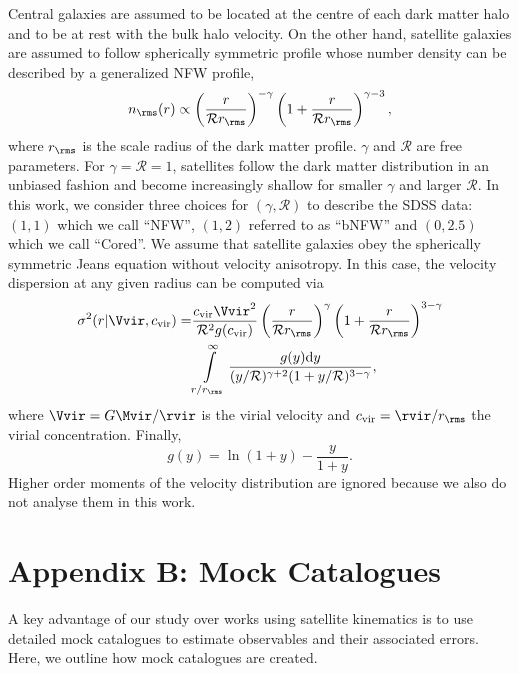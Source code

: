 \documentclass[fleqn,usenatbib,useAMS]{mnras}
\begin{document}
Central galaxies are assumed to be located at the centre of each dark matter halo and to be at rest with the bulk halo velocity. On the other hand, satellite galaxies are assumed to follow spherically symmetric profile whose number density can be described by a generalized NFW profile,
\begin{equation}
n_\rms (r) \propto \left( \frac{r}{\mathcal{R} r_\rms} \right)^{-\gamma} \left( 1 + \frac{r}{\mathcal{R} r_\rms} \right)^{\gamma - 3},
\end{equation}
where $r_\rms$ is the scale radius of the dark matter profile. $\gamma$ and $\mathcal{R}$ are free parameters. For $\gamma = \mathcal{R} = 1$, satellites follow the dark matter distribution in an unbiased fashion and become increasingly shallow for smaller $\gamma$ and larger $\mathcal{R}$. In this work, we consider three choices for $(\gamma, \mathcal{R})$ to describe the SDSS data: $(1, 1)$ which we call ``NFW'', $(1, 2)$ referred to as ``bNFW'' and $(0, 2.5)$ which we call ``Cored''.
We assume that satellite galaxies obey the spherically symmetric Jeans equation without velocity anisotropy. In this case, the velocity dispersion at any given radius can be computed via
\begin{align}
\sigma^2 (r | \Vvir, c_{\rm vir}) =& \frac{c_{\rm vir} \Vvir^2}{\mathcal{R}^2 g(c_{\rm vir})} \left( \frac{r}{\mathcal{R} r_\rms} \right)^\gamma\left( 1 + \frac{r}{\mathcal{R} r_\rms} \right)^{3 - \gamma} \nonumber\\
&\int\limits_{r / r_\rms}^{\infty} \frac{g(y)\mathrm{d}y}{(y / \mathcal{R})^{\gamma + 2} (1 + y / \mathcal{R})^{3 - \gamma}},
\label{eq:Jeans}
\end{align}
where $\Vvir = G \Mvir / \rvir$ is the virial velocity and $c_{\rm vir} = \rvir / r_\rms$ the virial concentration. Finally,
\begin{equation}
g(y) = \ln (1 + y) - \frac{y}{1 + y}.
\end{equation}
Higher order moments of the velocity distribution are ignored because we also do not analyse them in this work.

\section*{Appendix B: Mock Catalogues}
\label{sec:mock_catalogues}

A key advantage of our study over works using satellite kinematics is to use detailed mock catalogues to estimate observables and their associated errors. Here, we outline how mock catalogues are created.
\end{document}
